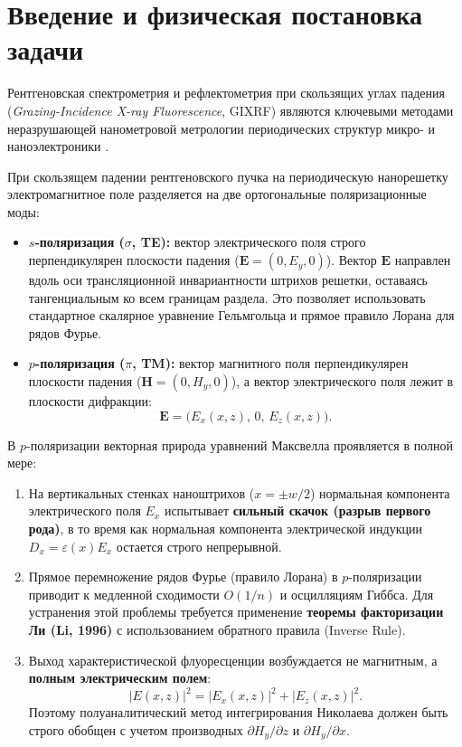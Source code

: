 \documentclass[a4paper,11pt]{article}
\begin{document}
\newpage
\tableofcontents
\newpage

\section*{Введение и физическая постановка задачи}

Рентгеновская спектрометрия и рефлектометрия при скользящих углах падения (\textit{Grazing-Incidence X-ray Fluorescence}, GIXRF) являются ключевыми методами неразрушающей нанометровой метрологии периодических структур микро- и наноэлектроники \cite{soltwisch2018, nikolaev2020}. 

При скользящем падении рентгеновского пучка на периодическую нанорешетку электромагнитное поле разделяется на две ортогональные поляризационные моды:
\begin{itemize}
    \item \textbf{$s$-поляризация ($\sigma$, TE):} вектор электрического поля строго перпендикулярен плоскости падения ($\mathbf{E} = (0, E_y, 0)$). Вектор $\mathbf{E}$ направлен вдоль оси трансляционной инвариантности штрихов решетки, оставаясь тангенциальным ко всем границам раздела. Это позволяет использовать стандартное скалярное уравнение Гельмгольца и прямое правило Лорана для рядов Фурье.
    \item \textbf{$p$-поляризация ($\pi$, TM):} вектор магнитного поля перпендикулярен плоскости падения ($\mathbf{H} = (0, H_y, 0)$), а вектор электрического поля лежит в плоскости дифракции:
    \begin{equation}
        \mathbf{E} = \big(E_x(x, z), \, 0, \, E_z(x, z)\big).
    \end{equation}
\end{itemize}

В $p$-поляризации векторная природа уравнений Максвелла проявляется в полной мере:
\begin{enumerate}
    \item На вертикальных стенках наноштрихов ($x = \pm w/2$) нормальная компонента электрического поля $E_x$ испытывает \textbf{сильный скачок (разрыв первого рода)}, в то время как нормальная компонента электрической индукции $D_x = \varepsilon(x) E_x$ остается строго непрерывной.
    \item Прямое перемножение рядов Фурье (правило Лорана) в $p$-поляризации приводит к медленной сходимости $O(1/n)$ и осцилляциям Гиббса. Для устранения этой проблемы требуется применение \textbf{теоремы факторизации Ли (Li, 1996)} с использованием обратного правила (Inverse Rule).
    \item Выход характеристической флуоресценции возбуждается не магнитным, а \textbf{полным электрическим полем}:
    \begin{equation}
        |E(x, z)|^2 = |E_x(x, z)|^2 + |E_z(x, z)|^2.
    \end{equation}
    Поэтому полуаналитический метод интегрирования Николаева \cite{nikolaev2020} должен быть строго обобщен с учетом производных $\partial H_y / \partial z$ и $\partial H_y / \partial x$.
\end{enumerate}
\end{document}
